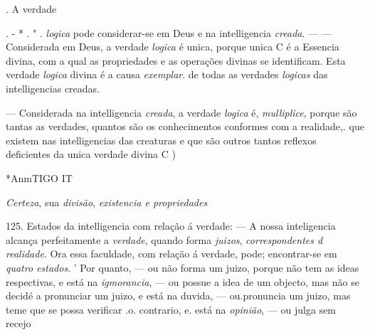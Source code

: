 
  
. A verdade

. - * . " . \emph{logica} pode considerar-se em Deus e na intelligencia \emph{creada}. ---   \textbar{} --- Considerada em Deus, a verdade \emph{logica} é unica, porque unica C é a Essencia divina, com a qual as propriedades e as operações   divinas se identificam. Esta verdade \emph{logica} divina é a causa \emph{exemplar}. de todas as verdades \emph{logicas} das intelligencias creadas.

--- Considerada na intelligencia \emph{creada}, a verdade \emph{logica} é, \emph{mulliplice}, porque são tantas as verdades, quantos são os conhecimentos conformes com a realidade,. que existem nas intelligencias das creaturas e que são outros tantos reflexos deficientes da unica verdade divina C )

*AnmTIGO IT

\emph{Certeza}, sua \emph{divisão}, \emph{existencia e propriedades}

125. Estados da intelligencia com relação á verdade: --- A nossa inteligencia alcança perfeitamente a \emph{verdade}, quando forma \emph{juizos}, \emph{correspondentes d realidade}. Ora essa faculdade, com relação á verdade, pode; encontrar-se em \emph{quatro estados}. ' Por quanto, --- ou não forma um juizo, porque não tem as ideas respectivas, e está na \emph{igmorancia}, --- ou possue a idea de um objecto, mas não se decidé a pronunciar um juizo, e está na duvida, --- ou.pronuncia um juizo, mas teme que se possa verificar .o. contrario, e. está na \emph{opinião}, --- ou julga sem recejo

